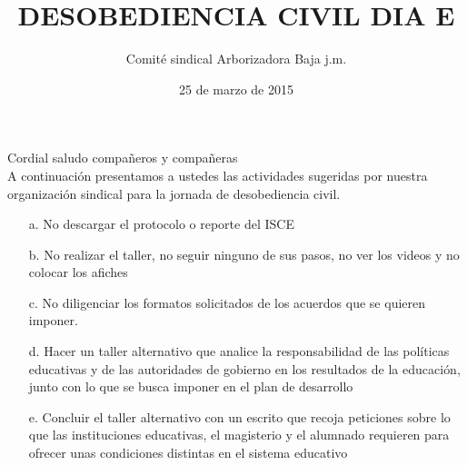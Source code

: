 \documentclass[10pt]{article}
\author{Comité sindical Arborizadora Baja j.m.}
\title{DESOBEDIENCIA CIVIL DIA E}
\date{25 de marzo de 2015}
\begin{document}
\maketitle
Cordial saludo compañeros y compañeras\\

A continuación presentamos a ustedes las actividades sugeridas por nuestra organización sindical para la jornada de desobediencia civil.
\begin{itemize}
\item[a.] No descargar el protocolo o reporte del ISCE
\item[b.] No realizar el taller, no seguir ninguno de sus pasos, no ver los videos y no colocar los afiches
\item[c.] No diligenciar los formatos solicitados de los acuerdos que se quieren imponer.
\item[d.] Hacer un taller alternativo que analice la responsabilidad de las políticas educativas y de las autoridades de gobierno en los resultados de la educación, junto con lo que se busca imponer en el plan de desarrollo
\item[e.] Concluir el taller alternativo con un escrito que recoja peticiones sobre lo que las instituciones educativas, el magisterio y el alumnado requieren para ofrecer unas condiciones distintas en el sistema educativo
\end{itemize}
\end{document}
